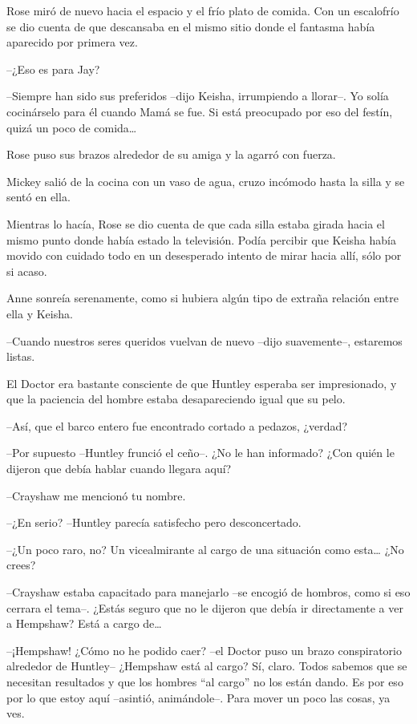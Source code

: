 {Rose miró de nuevo hacia el espacio y el frío plato de comida. Con un
 escalofrío se dio cuenta de que descansaba en el mismo sitio donde el
fantasma había aparecido por primera vez.}

{--¿Eso es para Jay?}

{--Siempre han sido sus preferidos --dijo Keisha, irrumpiendo a
 llorar--. Yo solía cocinárselo para él cuando Mamá se fue. Si está
 preocupado por eso del festín, quizá un poco de comida\ldots{}}

{Rose puso sus brazos alrededor de su amiga y la agarró con fuerza.}

{Mickey salió de la cocina con un vaso de agua, cruzo incómodo hasta la
silla y se sentó en ella.}

{Mientras lo hacía, Rose se dio cuenta de que cada silla estaba girada
 hacia el mismo punto donde había estado la televisión. Podía percibir
 que Keisha había movido con cuidado todo en un desesperado intento de
mirar hacia allí, sólo por si acaso.}

{Anne sonreía serenamente, como si hubiera algún tipo de extraña
relación entre ella y Keisha.}

{--Cuando nuestros seres queridos vuelvan de nuevo --dijo suavemente--,
estaremos listas.}

\mbox{}

{El Doctor era bastante consciente de que Huntley esperaba ser
 impresionado, y que la paciencia del hombre estaba desapareciendo igual
que su pelo.}

{--Así, que el barco entero fue encontrado cortado a pedazos, ¿verdad?}

{--Por supuesto --Huntley frunció el ceño--. ¿No le han informado? ¿Con
quién le dijeron que debía hablar cuando llegara aquí?}

{--Crayshaw me mencionó tu nombre.}

{--¿En serio? --Huntley parecía satisfecho pero desconcertado.}

{--¿Un poco raro, no? Un vicealmirante al cargo de una situación como
 esta\ldots{} ¿No crees?}

{--Crayshaw estaba capacitado para manejarlo --se encogió de hombros,
 como si eso cerrara el tema--. ¿Estás seguro que no le dijeron que debía
 ir directamente a ver a Hempshaw? Está a cargo de\ldots{}}

{--¡Hempshaw! ¿Cómo no he podido caer? --el Doctor puso un brazo
 conspiratorio alrededor de Huntley-- ¿Hempshaw está al cargo? Sí, claro.
 Todos sabemos que se necesitan resultados y que los hombres ``al cargo''
 no los están dando. Es por eso por lo que estoy aquí --asintió,
animándole--. Para mover un poco las cosas, ya ves.}

